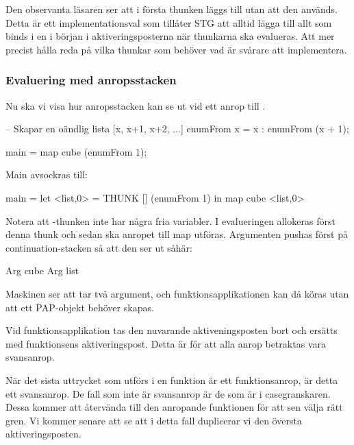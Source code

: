 \documentclass[../Core]{subfiles}
\begin{document}
Den observanta läsaren ser att i första thunken läggs  till utan att den används. 
Detta är ett implementationsval som tillåter STG att alltid lägga till allt som 
binds i en  i början i aktiveringsposterna när thunkarna ska evalueras. 
Att mer precist hålla reda på vilka thunkar som behöver vad är svårare att implementera.




\subsubsection{Evaluering med anropsstacken}


Nu ska vi visa hur anropsstacken kan se ut vid ett anrop till .


\begin{codeEx}
-- Skapar en oändlig lista [x, x+1, x+2, ...]
enumFrom x = x : enumFrom (x + 1);

main = map cube (enumFrom 1);
\end{codeEx}

Main avsockras till:
\begin{codeEx}
main = let <list,0> = THUNK [] (enumFrom 1)
       in  map cube <list,0>
\end{codeEx}
Notera att -thunken inte har några fria variabler.
I evalueringen allokeras först denna thunk och sedan ska anropet till map
utföras. 
Argumenten pushas först på continuation-stacken så att den ser ut såhär:
\begin{codeEx}
Arg cube
Arg list
\end{codeEx}

Maskinen ser att  tar två argument, och funktionsapplikationen 
kan då köras utan att ett PAP-objekt behöver skapas.

Vid funktionsapplikation tas den nuvarande aktiveningsposten bort och ersätts 
med funktionsens aktiveringspost. Detta är för att alla anrop betraktas vara
svansanrop.

När det sista uttrycket som utförs i en funktion är ett funktionsanrop, är
detta ett svansanrop. De fall som inte är svansanrop
är de som är i casegranskaren. Dessa kommer att återvända till den anropande
funktionen för att sen välja rätt gren. Vi kommer senare att se att i detta
fall duplicerar vi den översta aktiveringsposten. 
\end{document}
